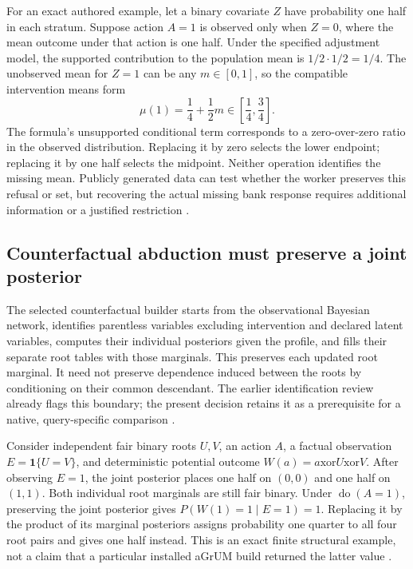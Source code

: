For an exact authored example, let a binary covariate $Z$ have probability
one half in each stratum. Suppose action $A=1$ is observed only when $Z=0$,
where the mean outcome under that action is one half. Under the specified
adjustment model, the supported contribution to the population mean is
$1/2\cdot1/2=1/4$. The unobserved mean for $Z=1$ can be any $m\in[0,1]$,
so the compatible intervention means form
\[
 \mu(1)=\frac14+\frac12m\in\left[\frac14,\frac34\right].
\]
The formula's unsupported conditional term corresponds to a zero-over-zero
ratio in the observed distribution. Replacing it by zero selects the lower
endpoint; replacing it by one half selects the midpoint. Neither operation
identifies the missing mean. Publicly generated data can test whether the
worker preserves this refusal or set, but recovering the actual missing
bank response requires additional information or a justified restriction
\citep{exec24_agrum_choice}.

\subsection{Counterfactual abduction must preserve a joint posterior}
The selected counterfactual builder starts from the observational Bayesian
network, identifies parentless variables excluding intervention and declared
latent variables, computes their individual posteriors given the profile,
and fills their separate root tables with those marginals. This preserves
each updated root marginal. It need not preserve dependence induced between
the roots by conditioning on their common descendant. The earlier
identification review already flags this boundary; the present decision
retains it as a prerequisite for a native, query-specific comparison
\citep{exec19_cxx_identification_source,exec24_agrum_source}.

Consider independent fair binary roots $U,V$, an action $A$, a factual
observation $E=\mathbf1\{U=V\}$, and deterministic potential outcome
$W(a)=a\mathbin{\mathrm{xor}}U\mathbin{\mathrm{xor}}V$.
After observing $E=1$, the joint posterior places one half on $(0,0)$ and
one half on $(1,1)$. Both individual root marginals are still fair binary.
Under $\operatorname{do}(A=1)$, preserving the joint posterior gives
$P(W(1)=1\mid E=1)=1$. Replacing it by the product of its marginal
posteriors assigns probability one quarter to all four root pairs and gives
one half instead. This is an exact finite structural example, not a claim
that a particular installed aGrUM build returned the latter value
\citep{exec24_agrum_choice}.


